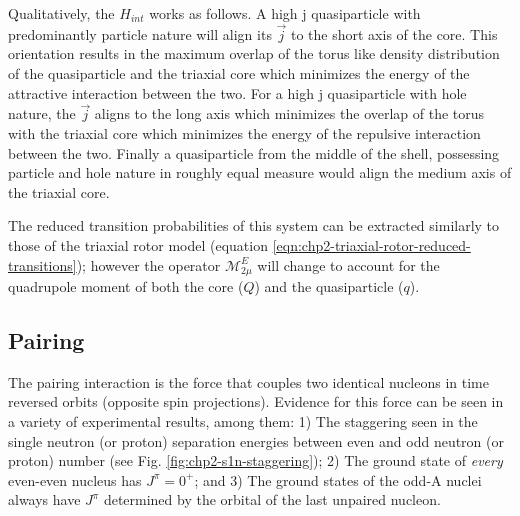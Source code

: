 Qualitatively, the $H_{int}$ works as follows. A high j quasiparticle with predominantly particle nature will align its $\vec{j}$ to the short axis of the core. This orientation results in the maximum overlap of the torus like density distribution of the quasiparticle and the triaxial core which minimizes the energy of the attractive interaction between the two. For a high j quasiparticle with hole nature, the $\vec{j}$ aligns to the long axis which minimizes the overlap of the torus with the triaxial core which minimizes the energy of the repulsive interaction between the two. Finally a quasiparticle from the middle of the shell, possessing particle and hole nature in roughly equal measure would align the medium axis of the triaxial core.

The reduced transition probabilities of this system can be extracted similarly to those of the triaxial rotor model (equation \ref{eqn:chp2-triaxial-rotor-reduced-transitions}); however the operator $\mathcal{M}^E_{2\mu}$ will change to account for the quadrupole moment of both the core ($Q$) and the quasiparticle ($q$).

\subsection{Pairing}
\label{ssec:models-pairing}
The pairing interaction is the force that couples two identical nucleons in time reversed orbits (opposite spin projections). Evidence for this force can be seen in a variety of experimental results, among them: 1) The staggering seen in the single neutron (or proton) separation energies between even and odd neutron (or proton) number (see Fig. \ref{fig:chp2-s1n-staggering}); 2) The ground state of \emph{every} even-even nucleus has $J^{\pi}=0^+$; and 3) The ground states of the odd-A nuclei always have $J^{\pi}$ determined by the orbital of the last unpaired nucleon.

